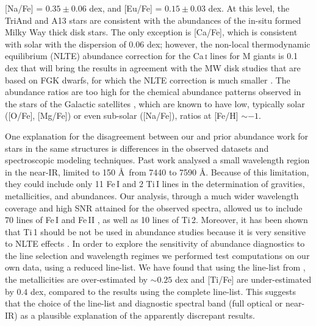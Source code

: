 \documentclass[galaxies,article,submit,moreauthors,pdftex,10pt,a4paper]{mdpi}
\newcommand{\ion}[2]{#1\,\textsc{#2}}
\begin{document}
[Na/Fe] = $0.35 \pm 0.06$ dex, and [Eu/Fe] = $0.15 \pm 0.03$ dex.
At this level, the TriAnd and A13 stars are consistent with the abundances of
the in-situ formed Milky Way thick disk
stars\cite{fuhrmann2004,bergemann2014,bensby2014}.
The only exception is [Ca/Fe], which is consistent with solar with the dispersion of 0.06 dex; however, the non-local thermodynamic equilibrium (NLTE) abundance correction for the \ion{Ca}{i} lines for M giants is 0.1 dex that will bring the results in agreement with the MW disk studies that are based on FGK dwarfs, for which the NLTE correction is much smaller \cite{Merle2011}.
The abundance ratios are too high for the chemical abundance patterns observed in the stars of the Galactic satellites \cite{Bonifacio:2000,shetrone2001,shetrone2003,Tolstoy:2009,deBoer:2014}, which are known to have low, typically solar ([O/Fe], [Mg/Fe]) or even sub-solar ([Na/Fe]), ratios at [Fe/H] $\sim -1$.


One explanation for the disagreement between our and prior abundance work for
stars in the same structures is differences in the observed datasets and
spectroscopic modeling techniques.
Past work \cite{chou2010b,chou11} analysed a small wavelength region in the near-IR, limited to 150 \AA\ from 7440 to 7590 \AA. Because of this limitation, they could include only 11 \ion{Fe}{I} and 2 \ion{Ti}{I} lines in the determination of gravities, metallicities, and abundances. Our analysis, through a much wider wavelength coverage and high SNR attained for the observed spectra, allowed us to include 70 lines of \ion{Fe}{I} and \ion{Fe}{II} \cite{bergemann2012}, as well as 10 lines of \ion{Ti}{2}. Moreover, it has been shown that \ion{Ti}{1} should be not be used in abundance studies because it is very sensitive to NLTE effects \cite{bergemann2011}.
In order to explore the sensitivity of abundance diagnostics to the line selection and wavelength regimes we performed test computations on our own data, using a reduced line-list. We have found that using the line-list from \cite{chou2010a}, the metallicities are over-estimated by $\sim 0.25$ dex and [Ti/Fe] are under-estimated by $0.4$ dex, compared to the results using the complete line-list. This suggests that the choice of the line-list and diagnostic spectral band (full optical or near-IR) as a plausible explanation  of the apparently discrepant results.
\end{document}
